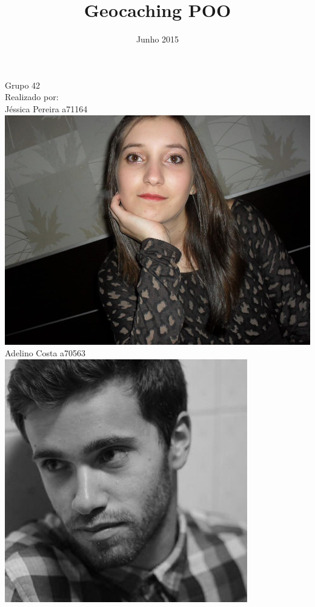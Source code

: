 \documentclass{article}
\title{Geocaching POO}
\date{Junho 2015}
\begin{document}
\maketitle
\begin{center}
Grupo 42 \\
Realizado por: \\
Jéssica Pereira a71164	\\
\includegraphics[height=3\baselineskip,natwidth=369,natheight=430]{jessica0.jpg}\\
Adelino Costa a70563\\
\includegraphics[height=3\baselineskip,natwidth=369,natheight=430]{adelino.jpg}\\

\end{center}
\end{document}
